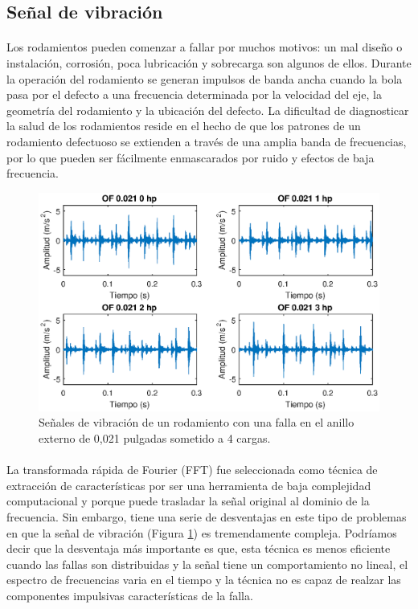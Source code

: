 \documentclass[a4paper,12pt]{article}
\begin{document}
\subsection{Señal de vibración}
\paragraph{}
Los rodamientos pueden comenzar a fallar por muchos motivos: un mal diseño o instalación, corrosión, poca lubricación y sobrecarga son algunos de ellos. Durante la operación del rodamiento se generan impulsos de banda ancha cuando la bola pasa por el defecto a una frecuencia determinada por la velocidad del eje, la geometría del rodamiento y la ubicación del defecto. La dificultad de diagnosticar la salud de los rodamientos reside en el hecho de que los patrones de un rodamiento defectuoso se extienden a través de una amplia banda de frecuencias, por lo que pueden ser fácilmente enmascarados por ruido y efectos de baja frecuencia.

\begin{figure}[ht]
  \centering
    \includegraphics[scale=0.9]{./signalOF.eps}
  \caption{Señales de vibración de un rodamiento con una falla en el anillo externo de 0,021 pulgadas sometido a 4 cargas.}
  \label{fig:senales}
\end{figure}

\paragraph{}
La transformada rápida de Fourier (FFT) fue seleccionada como técnica de extracción de características por ser una herramienta de baja complejidad computacional y porque puede trasladar la señal original al dominio de la frecuencia. Sin embargo, tiene una serie de desventajas en este tipo de problemas en que la señal de vibración (Figura \ref{fig:senales}) es tremendamente compleja. Podríamos decir que la desventaja más importante es que, esta técnica es menos eficiente cuando las fallas son distribuidas y la señal tiene un comportamiento no lineal, el espectro de frecuencias varia en el tiempo y la técnica no es capaz de realzar las componentes impulsivas características de la falla.
\end{document}
